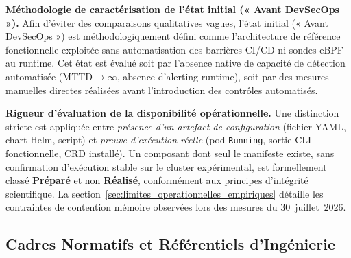 \textbf{Méthodologie de caractérisation de l'état initial (« Avant DevSecOps »).} Afin d'éviter des comparaisons qualitatives vagues, l'état initial (« Avant DevSecOps ») est méthodologiquement défini comme l'architecture de référence fonctionnelle exploitée sans automatisation des barrières CI/CD ni sondes eBPF au runtime. Cet état est évalué soit par l'absence native de capacité de détection automatisée ($\text{MTTD} \rightarrow \infty$, absence d'alerting runtime), soit par des mesures manuelles directes réalisées avant l'introduction des contrôles automatisés.

\textbf{Rigueur d'évaluation de la disponibilité opérationnelle.} Une distinction stricte est appliquée entre \textit{présence d'un artefact de configuration} (fichier YAML, chart Helm, script) et \textit{preuve d'exécution réelle} (pod \texttt{Running}, sortie CLI fonctionnelle, CRD installé). Un composant dont seul le manifeste existe, sans confirmation d'exécution stable sur le cluster expérimental, est formellement classé \textbf{Préparé} et non \textbf{Réalisé}, conformément aux principes d'intégrité scientifique. La section~\ref{sec:limites_operationnelles_empiriques} détaille les contraintes de contention mémoire observées lors des mesures du 30~juillet~2026.

\subsection{Cadres Normatifs et Référentiels d'Ingénierie}

